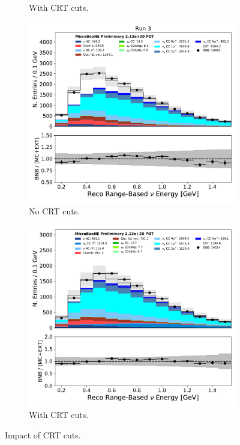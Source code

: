 \begin{figure}[H]
\begin{center}
\begin{subfigure}[b]{0.35\textwidth}
        \caption{With CRT cuts.}
        \label{fig:NuMUCCsel:ryan:run3_costheta_withCRT}
    \end{subfigure}
    \begin{subfigure}[b]{0.35\textwidth}
        \centering
        \includegraphics[width=1.00\textwidth]{NuMuCCsel/Images/Ryan/Run3_nocrt/reco_nu_e_range_v_08052020_full_samples_longest_noCRT_event_category.pdf}
        \caption{No CRT cuts.}
        \label{fig:NuMUCCsel:ryan:run3_Enu_noCRT}
    \end{subfigure}
    \begin{subfigure}[b]{0.35\textwidth}
        \centering
        \includegraphics[width=1.00\textwidth]{NuMuCCsel/Images/Ryan/fullselection_run3_fullsystematics/reco_nu_e_range_v_07232020_fullsel_samples_detsys_event_category.pdf}
        \caption{With CRT cuts.}
        \label{fig:NuMUCCsel:ryan:run3_Enu_withCRT}
    \end{subfigure}
\caption{Impact of CRT cuts.}
\label{fig:NuMuCCsel:crtimpact}
\end{center}
\end{figure}

